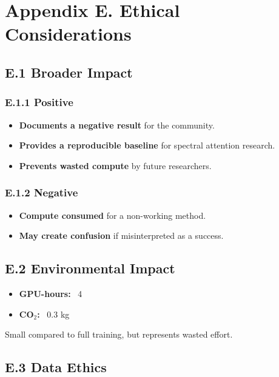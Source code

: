 
\section{Appendix E. Ethical Considerations}

\subsection{E.1 Broader Impact}

\subsubsection{E.1.1 Positive}

\begin{itemize}
\item \textbf{Documents a negative result} for the community.
\item \textbf{Provides a reproducible baseline} for spectral attention research.
\item \textbf{Prevents wasted compute} by future researchers.

\end{itemize}
\subsubsection{E.1.2 Negative}

\begin{itemize}
\item \textbf{Compute consumed} for a non-working method.
\item \textbf{May create confusion} if misinterpreted as a success.

\end{itemize}
\subsection{E.2 Environmental Impact}

\begin{itemize}
\item \textbf{GPU-hours:} ~4
\item \textbf{CO$_2$:} ~0.3 kg

\end{itemize}
Small compared to full training, but represents wasted effort.

\subsection{E.3 Data Ethics}

